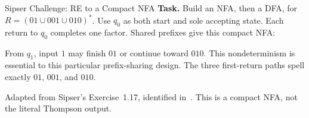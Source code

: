 \documentclass[10pt]{beamer}
\begin{document}
\begin{frame}{Sipser Challenge: RE to a Compact NFA}
  \small
  \textbf{Task.} Build an NFA, then a DFA, for
  $R=(01\cup001\cup010)^*$.
  \pause
  Use $q_0$ as both start and sole accepting state. Each return to $q_0$
  completes one factor. Shared prefixes give this compact NFA:
  \begin{center}
  \end{center}
  \pause
  From $q_1$, input $1$ may finish $01$ or continue toward $010$.
  This nondeterminism is essential to this particular prefix-sharing design.
  The three first-return paths spell exactly $01$, $001$, and $010$.
  \par\smallskip
  {\scriptsize Adapted from Sipser's Exercise~1.17, identified
  in~\cite{sheard}. This is a compact NFA, not the literal Thompson output.}
\end{frame}
\end{document}

